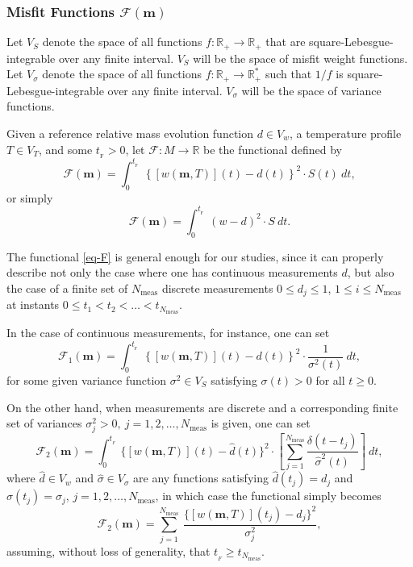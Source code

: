 \subsubsection{Misfit Functions $\mathcal{F}(\mathbf{m})$}

Let
$V_S$ denote the space of all functions $f:\mathbb{R}_{+}\rightarrow\mathbb{R}_{+}$ that are square-Lebesgue-integrable
over any finite interval.
$V_S$ will be the space of misfit weight functions.
Let
$V_{\sigma}$ denote the space of all functions $f:\mathbb{R}_{+}\rightarrow\mathbb{R}_+^{*}$ such that $1/f$ is square-Lebesgue-integrable
over any finite interval.
$V_{\sigma}$ will be the space of variance functions.

Given a reference relative mass evolution function $\text{$d$}\in V_w$,
a temperature profile $T\in V_T$,
and some $t_{_{\text{F}}}>0$,
let $\mathcal{F}:M\rightarrow\mathbb{R}$ be the functional defined by
\begin{equation*}
\mathcal{F}(\mathbf{m}) = \int_{0}^{t_{_{\text{F}}}}~\left\{[w(\mathbf{m},T)](t)-\text{$d$}(t)\right\}^2\cdot S(t)~dt,
\end{equation*}
or simply
\begin{equation}\label{eq-F}
\mathcal{F}(\mathbf{m}) = \int_{0}^{t_{_{\text{F}}}}~(w-d)^2\cdot S~dt.
\end{equation}


The functional \eqref{eq-F} is general enough for our studies, since it can properly describe
not only the case where one has continuous measurements $\text{$d$}$,
but also the case of a finite set of $N_{\text{meas}}$ discrete measurements $0\leqslant d_j\leqslant 1$,
$1\leqslant i\leqslant N_{\text{meas}}$ at instants $0\leqslant t_1 < t_2 < \ldots < t_{N_{\text{meas}}}$.

In the case of continuous measurements, for instance, one can set
\begin{equation*}
\mathcal{F}_1(\mathbf{m}) = \int_{0}^{t_{_{\text{F}}}}~\left\{[w(\mathbf{m},T)](t)-\text{$d$}(t)\right\}^2\cdot\frac{1}{\sigma^2(t)}~dt,
\end{equation*}
for some given variance function $\sigma^2\in V_S$ satisfying $\sigma(t)>0$ for all $t\geqslant 0$.

On the other hand, when measurements are discrete and a corresponding finite set of variances $\sigma_j^2>0,~j=1,2,\ldots,N_{\text{meas}}$ is given, one can set
\begin{equation*}
\mathcal{F}_2(\mathbf{m}) = \int_0^{t_{_F}}~\{[w(\mathbf{m},T)](t)-\hat{d}(t)\}^2\cdot\left[\sum_{j=1}^{N_{\text{meas}}}\frac{\delta(t-t_j)}{{\hat{\sigma}}^2(t)}\right]~dt,
\end{equation*}
where
$\hat{d}\in V_w$ and $\hat{\sigma}\in V_{\sigma}$ are any functions satisfying
$\hat{d}(t_j)=d_j$ and $\hat{\sigma}(t_j)=\sigma_j$, $j=1,2,\ldots,N_{\text{meas}}$,
in which case the functional simply becomes
\begin{equation*}
\mathcal{F}_2(\mathbf{m}) = \sum_{j=1}^{N_{\text{meas}}}~\frac{\{[w(\mathbf{m},T)](t_j)-d_j\}^2}{\sigma_j^2},
\end{equation*}
assuming, without loss of generality, that $t_{_F}\geqslant t_{N_{\text{meas}}}$.

